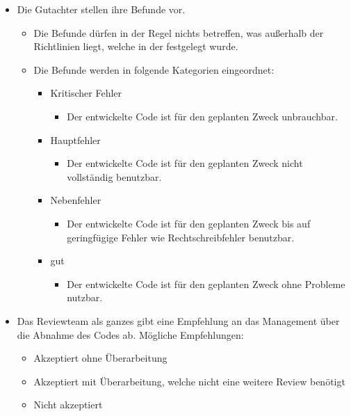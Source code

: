 \documentclass[	%
		fontsize=11pt,  %
		a4paper,	    %
		ngerman,		%
		sans,			%
		f4,				%
	]{HsH-report}		%
\begin{document}
\begin{itemize}
	\item Die Gutachter stellen ihre Befunde vor. \begin{itemize}
		      \item Die Befunde dürfen in der Regel nichts betreffen, was außerhalb der Richtlinien
		            liegt, welche in der  festgelegt wurde.
		      \item Die Befunde werden in folgende Kategorien eingeordnet: \begin{itemize}
			            \item Kritischer Fehler \begin{itemize}
				                  \item Der entwickelte Code ist für den geplanten Zweck unbrauchbar.
			                  \end{itemize}
			            \item Hauptfehler \begin{itemize}
				                  \item Der entwickelte Code ist für den geplanten Zweck nicht vollständig benutzbar.
			                  \end{itemize}
			            \item Nebenfehler \begin{itemize}
				                  \item Der entwickelte Code ist für den geplanten Zweck bis auf geringfügige Fehler
				                        wie Rechtschreibfehler benutzbar.
			                  \end{itemize}
			            \item gut \begin{itemize}
				                  \item Der entwickelte Code ist für den geplanten Zweck ohne Probleme nutzbar.
			                  \end{itemize}
		            \end{itemize}
	      \end{itemize}
	\item Das Reviewteam als ganzes gibt eine Empfehlung an das Management über die
	      Abnahme des Codes ab. Mögliche Empfehlungen: \begin{itemize}
		      \item Akzeptiert ohne Überarbeitung
		      \item Akzeptiert mit Überarbeitung, welche nicht eine weitere Review benötigt
		      \item Nicht akzeptiert
	      \end{itemize}
\end{itemize}
\end{document}
